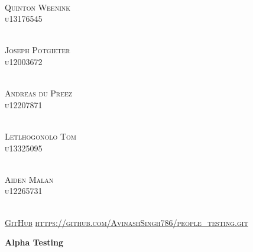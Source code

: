 \documentclass{article}
\begin{document}
\begin{titlepage}
\begin{center}
\begin{multicols}{2}
				\columnbreak
				
				\textsc{\large\\
					Quinton Weenink\\
					u13176545\\
				}
				
				\textsc{\large\\
					Joseph Potgieter\\
					u12003672\\
				}
				
				\textsc{\large\\
					Andreas du Preez\\
					u12207871\\
				}
				
				\textsc{\large\\
					Letlhogonolo Tom\\
					u13325095\\
				}
				
				\textsc{\large\\
					Aiden Malan\\
					u12265731\\
				}
				
			\end{multicols}
			
			
			\textsc{	\\ \href{https://github.com/AvinashSingh786/people_testing.git}{GitHub}
				\url{https://github.com/AvinashSingh786/people_testing.git}}
			
		\end{center}
	\end{titlepage}
	
	\tableofcontents
	\thispagestyle{empty}
	\cleardoublepage
	
	\setcounter{page}{1}
	
	\vspace*{\fill}
	\begin{center}
		\Huge \textbf{Alpha Testing}
	\end{center}
	\vspace*{\fill}
	
\end{document}
